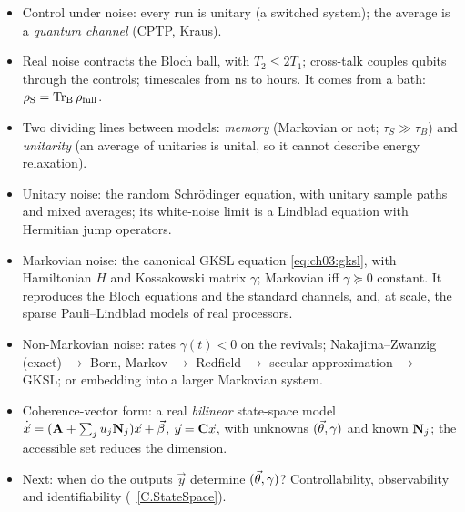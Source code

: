 \documentclass[handoutsbeamer.tex]{subfiles}
\begin{document}
\begin{frame}\mop{\footnotesize}
\begin{itemize}\setlength\itemsep{0.05em}
    \item Control under noise: every run is unitary (a switched system); the average is a \emph{quantum channel} (CPTP, Kraus).
    \item Real noise contracts the Bloch ball, with $T_2\le2T_1$; cross-talk couples qubits through the controls; timescales from ns to hours. It comes from a bath: $\rho_{\mathrm S}=\operatorname{Tr}_{\mathrm B}\rho_{\mathrm{full}}$.
    \item Two dividing lines between models: \emph{memory} (Markovian or not; $\tau_S\gg\tau_B$) and \emph{unitarity} (an average of unitaries is unital, so it cannot describe energy relaxation).
    \item Unitary noise: the random Schr\"odinger equation, with unitary sample paths and mixed averages; its white-noise limit is a Lindblad equation with Hermitian jump operators.
    \item Markovian noise: the canonical GKSL equation \eqref{eq:ch03:gksl}, with Hamiltonian $H$ and Kossakowski matrix $\gamma$; Markovian iff $\gamma\succeq0$ constant. It reproduces the Bloch equations and the standard channels, and, at scale, the sparse Pauli--Lindblad models of real processors.
    \item Non-Markovian noise: rates $\gamma(t)<0$ on the revivals; Nakajima--Zwanzig (exact) $\to$ Born, Markov $\to$ Redfield $\to$ secular approximation $\to$ GKSL; or embedding into a larger Markovian system.
    \item Coherence-vector form: a real \emph{bilinear} state-space model $\dot{\vec{x}}=(\mathbf{A}+\sum_ju_j\mathbf{N}_j)\vec{x}+\vec{\beta}$, $\vec y=\mathbf{C}\vec{x}$, with unknowns $(\vec{\theta},\gamma)$ and known $\mathbf{N}_j$; the accessible set reduces the dimension.
    \item Next: when do the outputs $\vec y$ determine $(\vec{\theta},\gamma)$? Controllability, observability and identifiability (\Chap~\ref{C.StateSpace}).
\end{itemize}
\end{frame}

\biblio
\end{document}
